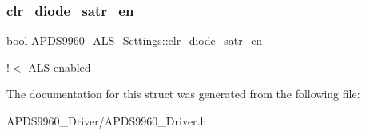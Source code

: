 \subsubsection{\texorpdfstring{clr\+\_\+diode\+\_\+satr\+\_\+en}{clr\_diode\_satr\_en}}
{\footnotesize\ttfamily bool A\+P\+D\+S9960\+\_\+\+A\+L\+S\+\_\+\+Settings\+::clr\+\_\+diode\+\_\+satr\+\_\+en}

!$<$ A\+LS enabled 

The documentation for this struct was generated from the following file\+:\begin{DoxyCompactItemize}
\item 
A\+P\+D\+S9960\+\_\+\+Driver/A\+P\+D\+S9960\+\_\+\+Driver.\+h\end{DoxyCompactItemize}
